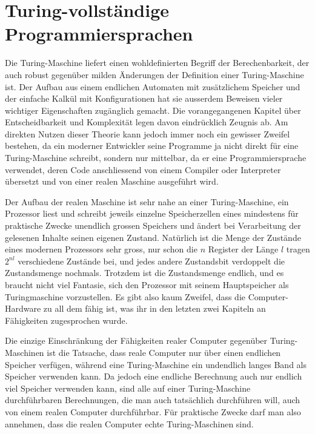 %
%
%

\section{Turing-vollständige Programmiersprachen}
Die Turing-Maschine liefert einen wohldefinierten Begriff der
Berechenbarkeit, der auch robust gegenüber milden Änderungen
der Definition einer Turing-Maschine ist.
Der Aufbau aus einem endlichen Automaten mit zusätzlichem
Speicher und der einfache Kalkül mit Konfigurationen hat
sie ausserdem Beweisen vieler wichtiger Eigenschaften zugänglich
gemacht. Die vorangegangenen Kapitel über Entscheidbarkeit und
Komplexität legen davon eindrücklich Zeugnis ab. Am direkten
Nutzen dieser Theorie kann jedoch immer noch ein gewisser Zweifel
bestehen, da ein moderner Entwickler seine Programme ja nicht
direkt für eine Turing-Maschine schreibt, sondern nur mittelbar,
da er eine Programmiersprache verwendet, deren Code anschliessend
von einem Compiler oder Interpreter übersetzt und von einer realen
Maschine ausgeführt wird.

Der Aufbau der realen Maschine ist sehr
nahe an einer Turing-Maschine, ein Prozessor liest und schreibt
jeweils einzelne
Speicherzellen eines mindestens für praktische Zwecke unendlich
grossen Speichers und ändert bei Verarbeitung der gelesenen
Inhalte seinen eigenen Zustand. Natürlich ist die Menge der
Zustände eines modernen Prozessors sehr gross, nur schon die $n$
Register der Länge $l$ tragen $2^{nl}$ verschiedene Zustände bei,
und jedes andere Zustandsbit verdoppelt die Zustandsmenge nochmals.
Trotzdem ist die Zustandsmenge endlich, und es braucht nicht viel
Fantasie, sich den Prozessor mit seinem Hauptspeicher als Turingmaschine
vorzustellen. Es gibt also kaum Zweifel, dass die Computer-Hardware
zu all dem fähig ist, was ihr in den letzten zwei Kapiteln an
Fähigkeiten zugesprochen wurde.

Die einzige Einschränkung der Fähigkeiten realer Computer gegenüber
Turing-Maschinen ist
die Tatsache, dass reale Computer nur über einen endlichen Speicher
verfügen, während eine Turing-Maschine ein undendlich langes Band
als Speicher verwenden kann. Da jedoch eine endliche Berechnung auch
nur endlich viel Speicher verwenden kann, sind alle auf einer Turing-Maschine
durchführbaren Berechnungen, die man auch tatsächlich durchführen
will, auch von einem realen Computer durchführbar. Für praktische
Zwecke darf man also annehmen, dass die realen Computer echte Turing-Maschinen
sind.

